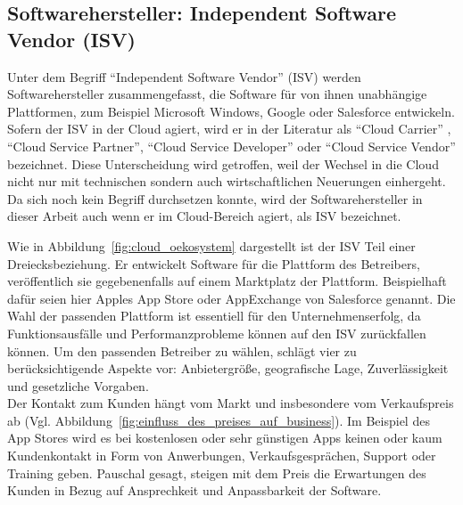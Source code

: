 
\subsection{Softwarehersteller: Independent Software Vendor (ISV)}
\label{cha:isv}
Unter dem Begriff "`Independent Software Vendor"' (ISV) werden 
Softwarehersteller 
zusammengefasst, die Software für von ihnen unabhängige Plattformen, zum 
Beispiel Microsoft Windows, Google oder Salesforce entwickeln. Sofern der ISV 
in der Cloud agiert, wird er in der Literatur als "`Cloud Carrier"'
, "`Cloud Service Partner"', 
"`Cloud Service Developer"' 
 oder "`Cloud Service 
Vendor"'  bezeichnet. Diese 
Unterscheidung wird getroffen, weil der Wechsel in die Cloud nicht nur mit 
technischen sondern auch wirtschaftlichen Neuerungen einhergeht. Da sich noch 
kein Begriff durchsetzen konnte, wird der Softwarehersteller in dieser Arbeit 
auch wenn er im Cloud-Bereich agiert, als ISV bezeichnet.



Wie in Abbildung~\ref{fig:cloud_oekosystem} dargestellt ist der ISV Teil einer 
Dreiecksbeziehung. Er entwickelt Software für die Plattform des Betreibers, 
veröffentlich sie gegebenenfalls auf einem Marktplatz der Plattform. 
Beispielhaft dafür seien hier Apples App Store oder AppExchange von Salesforce 
genannt. Die Wahl der passenden Plattform ist essentiell für den 
Unternehmenserfolg, da Funktionsausfälle und Performanzprobleme können auf den 
ISV zurückfallen können. Um den passenden Betreiber zu wählen, schlägt 
 vier zu berücksichtigende Aspekte 
vor: Anbietergröße, geografische Lage, Zuverlässigkeit und gesetzliche 
Vorgaben. \\

Der Kontakt zum Kunden hängt vom Markt und insbesondere vom Verkaufspreis ab 
(Vgl. Abbildung~\ref{fig:einfluss_des_preises_auf_business}). Im Beispiel des 
App Stores wird es bei kostenlosen oder sehr günstigen Apps keinen oder kaum 
Kundenkontakt in Form von Anwerbungen, Verkaufsgesprächen, Support oder  
Training geben. Pauschal gesagt, steigen mit dem Preis die Erwartungen des 
Kunden in Bezug auf Ansprechkeit und Anpassbarkeit der Software. 

